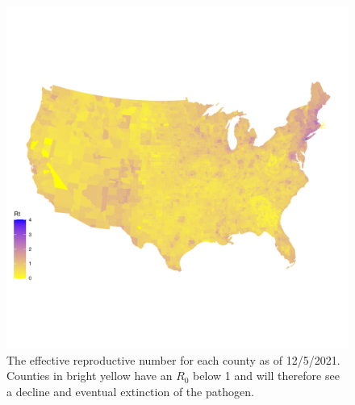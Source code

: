 \documentclass[
  12pt,
]{article}
\begin{document}
\begin{figure}[H]

{\centering \includegraphics{Final-Manuscript_files/figure-latex/fig5-1} 

}

\caption{The effective reproductive number for each county as of 12/5/2021. Counties in bright yellow have an \(R_0\) below 1 and will therefore see a decline and eventual extinction of the pathogen.}\label{fig:fig5}
\end{figure}
\end{document}
